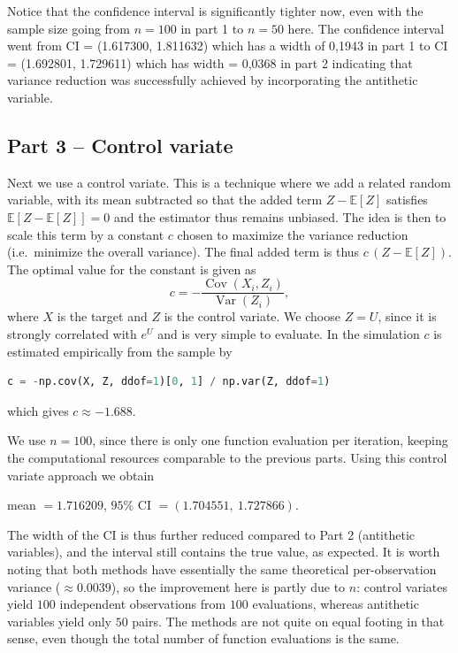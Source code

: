 Notice that the confidence interval is significantly tighter now, even with the sample size going from $n=100$ in part 1 to $n=50$ here. The confidence interval went from CI = (1.617300, 1.811632) which has a width of  0,1943 in part 1 to CI = (1.692801, 1.729611) which has width = 0,0368 in part 2 indicating that variance reduction was successfully achieved by incorporating the antithetic variable.

\subsection*{Part 3 -- Control variate}
Next we use a control variate. This is a technique where we add a related random variable, with its mean subtracted so that the added term $Z-\mathbb{E}[Z]$ satisfies $\mathbb{E}\!\left[Z-\mathbb{E}[Z]\right]=0$ and the estimator thus remains unbiased. The idea is then to scale this term by a constant $c$ chosen to maximize the variance reduction (i.e.\ minimize the overall variance). The final added term is thus $c\,(Z-\mathbb{E}[Z])$. The optimal value for the constant is given as
\[
c = -\frac{\operatorname{Cov}(X_i, Z_i)}{\operatorname{Var}(Z_i)},
\]
where $X$ is the target and $Z$ is the control variate. We choose $Z = U$, since it is strongly correlated with $e^{U}$ and is very simple to evaluate. In the simulation $c$ is estimated empirically from the sample by
\begin{lstlisting}[language=Python, basicstyle=\ttfamily\small]
c = -np.cov(X, Z, ddof=1)[0, 1] / np.var(Z, ddof=1)
\end{lstlisting}
which gives $c \approx -1.688$.

We use $n=100$, since there is only one function evaluation per iteration, keeping
the computational resources comparable to the previous parts. Using this control
variate approach we obtain
\begin{center}
mean $= 1.716209$, \quad $95\%$ CI $= (1.704551,\ 1.727866)$.
\end{center}
The width of the CI is thus further reduced compared to Part 2 (antithetic variables), and the interval still contains the true value, as expected. It is worth noting that both methods have essentially the same theoretical per-observation variance ($\approx 0.0039$), so the improvement here is partly due to $n$: control variates yield $100$ independent observations from $100$ evaluations, whereas antithetic variables yield only $50$ pairs. The methods are not quite on equal footing in that sense, even though the total number of function evaluations is the same.

